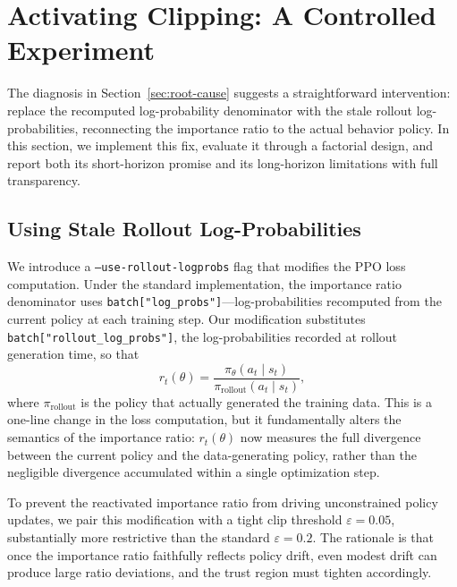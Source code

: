 
\section{Activating Clipping: A Controlled Experiment}
\label{sec:activating-clipping}

The diagnosis in Section~\ref{sec:root-cause} suggests a straightforward intervention: replace the recomputed log-probability denominator with the stale rollout log-probabilities, reconnecting the importance ratio to the actual behavior policy.
In this section, we implement this fix, evaluate it through a factorial design, and report both its short-horizon promise and its long-horizon limitations with full transparency.

\subsection{Using Stale Rollout Log-Probabilities}
\label{sec:stale-logprobs}

We introduce a \texttt{--use-rollout-logprobs} flag that modifies the PPO loss computation.
Under the standard implementation, the importance ratio denominator uses \texttt{batch["log\_probs"]}---log-probabilities recomputed from the current policy at each training step.
Our modification substitutes \texttt{batch["rollout\_log\_probs"]}, the log-probabilities recorded at rollout generation time, so that
\begin{equation}
\label{eq:stale-ratio}
r_t(\theta) = \frac{\pi_\theta(a_t \mid s_t)}{\pi_{\text{rollout}}(a_t \mid s_t)},
\end{equation}
where $\pi_{\text{rollout}}$ is the policy that actually generated the training data.
This is a one-line change in the loss computation, but it fundamentally alters the semantics of the importance ratio: $r_t(\theta)$ now measures the full divergence between the current policy and the data-generating policy, rather than the negligible divergence accumulated within a single optimization step.

To prevent the reactivated importance ratio from driving unconstrained policy updates, we pair this modification with a tight clip threshold $\varepsilon = 0.05$, substantially more restrictive than the standard $\varepsilon = 0.2$.
The rationale is that once the importance ratio faithfully reflects policy drift, even modest drift can produce large ratio deviations, and the trust region must tighten accordingly.

